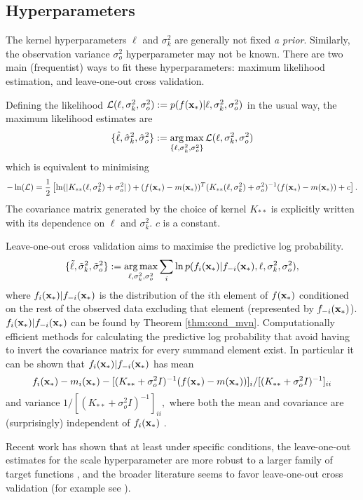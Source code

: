\subsection*{Hyperparameters}

The kernel hyperparameters $\ell$ and $\sigma^2_k$ are generally not fixed
\emph{a prior}. Similarly, the observation variance $\sigma^2_o$
hyperparameter may not be known.
There are two main (frequentist) ways to fit these hyperparameters:
maximum likelihood estimation, and leave-one-out cross validation.

Defining the likelihood
$
    \mathcal{L}(\ell, \sigma^2_k, \sigma^2_o)
    := p(f(\mathbf{x}_*) | \ell, \sigma^2_k, \sigma^2_o)
$ in the usual way,
the maximum likelihood estimates are
$$
    \{\hat{\ell}, \hat{\sigma}^2_k, \hat{\sigma}^2_o\} :=
    \operatorname*{arg\,max}_{\{\ell, \sigma^2_k, \sigma^2_o\}}
    \mathcal{L}(\ell, \sigma^2_k, \sigma^2_o)
$$
which is equivalent to minimising
$$
    -\ln(\mathcal{L}) =\frac{1}{2} \left[
    \ln (|K_{**}(\ell, \sigma^2_k) + \sigma^2_o|\,)
    + (f(\mathbf{x}_*) - m(\mathbf{x}_*))^T
    (K_{**}(\ell, \sigma^2_k) + \sigma^2_o)^{-1}
    (f(\mathbf{x}_*) - m(\mathbf{x}_*)) + c
    \right].
$$
The covariance matrix generated by the choice of kernel $K_{**}$ is
explicitly written with its dependence on $\ell$ and $\sigma^2_k.$ $c$ is a
constant.

Leave-one-out cross validation aims to maximise the predictive log
probability.
$$
    \{\tilde{\ell}, \tilde{\sigma}^2_k, \tilde{\sigma}^2_o\}
    := \operatorname*{arg\,max}_{\ell, \sigma^2_k, \sigma^2_o} \sum_{i}
    \ln p(f_i(\mathbf{x}_*) | f_{-i}(\mathbf{x}_*), \ell, \sigma^2_k, \sigma^2_o),
$$ where $f_i(\mathbf{x}_*) | f_{-i}(\mathbf{x}_*)$ is the distribution of the
$i$th element of $f(\mathbf{x}_*)$ conditioned on the rest of the
observed data excluding that element (represented by $f_{-i}(\mathbf{x}_*)$).
$f_i(\mathbf{x}_*) | f_{-i}(\mathbf{x}_*)$ can be found by
Theorem \ref{thm:cond_mvn}. Computationally efficient methods for calculating
the predictive log probability that avoid having to invert the covariance
matrix for every summand element exist. In particular it can be shown that
$f_i(\mathbf{x}_*) | f_{-i}(\mathbf{x}_*)$ has mean
$$
    f_i(\mathbf{x}_*) - m_i(\mathbf{x}_*)
    - [(K_{**} + \sigma^2_o I)^{-1}(f(\mathbf{x}_*) - m(\mathbf{x}_*))]_i
    /[(K_{**} + \sigma^2_o I)^{-1}]_{ii}
$$
and variance $1/[(K_{**} + \sigma^2_o I)^{-1}]_{ii},$ where both the mean and
covariance are (surprisingly) independent of $f_i(\mathbf{x}_*)$
\parencite[116]{rasmussen_gaussian_2008}.

Recent work has shown that at least under specific conditions, the
leave-one-out estimates for the scale hyperparameter are more robust to a larger
family of target functions \parencite{naslidnyk_comparing_2024}, and the
broader literature seems to favor leave-one-out cross validation (for example
see \cite{gutmann_bayesian_2016}).

